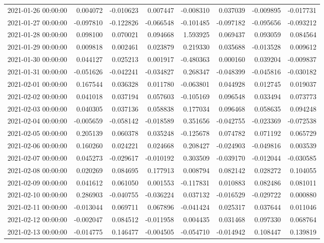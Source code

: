 \begin{tabular}{lrrrrrrr}
2021-01-26 00:00:00 & 0.004072 & -0.010623 & 0.007447 & -0.008310 & 0.037039 & -0.009895 & -0.017731 \\
2021-01-27 00:00:00 & -0.097810 & -0.122826 & -0.066548 & -0.101485 & -0.097182 & -0.095656 & -0.093212 \\
2021-01-28 00:00:00 & 0.098100 & 0.070021 & 0.094668 & 1.593925 & 0.069437 & 0.093059 & 0.084564 \\
2021-01-29 00:00:00 & 0.009818 & 0.002461 & 0.023879 & 0.219330 & 0.035688 & -0.013528 & 0.009612 \\
2021-01-30 00:00:00 & 0.044127 & 0.025213 & 0.001917 & -0.480363 & 0.000160 & 0.039204 & -0.009837 \\
2021-01-31 00:00:00 & -0.051626 & -0.042241 & -0.034827 & 0.268347 & -0.048399 & -0.045816 & -0.030182 \\
2021-02-01 00:00:00 & 0.167544 & 0.036328 & 0.011780 & -0.063801 & 0.044928 & 0.012745 & 0.019037 \\
2021-02-02 00:00:00 & 0.041018 & 0.037194 & 0.057603 & -0.105169 & 0.096548 & 0.033494 & 0.073773 \\
2021-02-03 00:00:00 & 0.040305 & 0.037136 & 0.058838 & 0.177034 & 0.096468 & 0.058635 & 0.094248 \\
2021-02-04 00:00:00 & -0.005659 & -0.058142 & -0.018589 & 0.351656 & -0.042755 & -0.023369 & -0.072538 \\
2021-02-05 00:00:00 & 0.205139 & 0.060378 & 0.035248 & -0.125678 & 0.074782 & 0.071192 & 0.065729 \\
2021-02-06 00:00:00 & 0.160260 & 0.024221 & 0.024668 & 0.208427 & -0.024903 & -0.049816 & 0.003539 \\
2021-02-07 00:00:00 & 0.045273 & -0.029617 & -0.010192 & 0.303509 & -0.039170 & -0.012044 & -0.030585 \\
2021-02-08 00:00:00 & 0.020269 & 0.084695 & 0.177913 & 0.008794 & 0.082142 & 0.028272 & 0.104055 \\
2021-02-09 00:00:00 & 0.041612 & 0.061050 & 0.001553 & -0.117831 & 0.010883 & 0.082486 & 0.081011 \\
2021-02-10 00:00:00 & 0.286903 & -0.040755 & -0.036224 & 0.037132 & -0.016529 & -0.029722 & 0.000880 \\
2021-02-11 00:00:00 & -0.013044 & 0.069711 & 0.067896 & -0.041424 & 0.025317 & 0.037644 & 0.011046 \\
2021-02-12 00:00:00 & -0.002047 & 0.084512 & -0.011958 & 0.004435 & 0.031468 & 0.097330 & 0.068764 \\
2021-02-13 00:00:00 & -0.014775 & 0.146477 & -0.004505 & -0.054710 & -0.014942 & 0.108447 & 0.139819 \\

\end{tabular}
